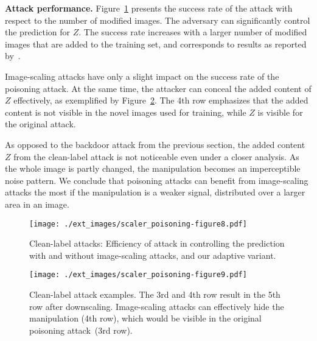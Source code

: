 \documentclass[conference]{IEEEtran}
\renewcommand{\paragraph}[1]{{\vskip 8pt \noindent\bf #1 }}
\newcommand{\ti}{\ensuremath{Z}\xspace}
\begin{document}
\paragraph{Attack performance.}
Figure~\ref{fig:eval_cleanlabel_scaling} presents the success rate of 
the attack with respect to the number of modified images. The adversary 
can significantly control the prediction for $\ti$. The success rate 
increases with a larger number of modified images that are added to the 
training set, and corresponds to results as reported 
by~\citet{ShaHuaNaj+18}. 


Image-scaling attacks have only a slight impact on 
the success rate of the poisoning attack. At the same time, the 
attacker can conceal the added content of $\ti$ effectively, as 
exemplified by Figure~\ref{fig:eval_cleanlabel_scaling_examples}. 
The 4th row emphasizes that the added content is not visible in the 
novel images used for training, while $\ti$ is visible for the original 
attack. 

As opposed to the backdoor attack from the previous {section\EndAccSupp{}}, the added
content \ti from the clean-label attack is not noticeable even under a
closer analysis.
As the whole image is partly changed, the manipulation becomes an 
imperceptible noise pattern. We conclude that poisoning attacks can 
benefit from image-scaling attacks the most if the manipulation is a 
weaker signal, {distributed\EndAccSupp{}} over a larger area in an image. 

\begin{figure}
	\centering
	\texttt{[image: ./ext\_images/scaler\_poisoning-figure8.pdf]}
	\vspace{-0.30cm}
	\caption{Clean-label attacks: Efficiency of attack in controlling 
	the prediction with and without image-scaling attacks, and our 
	adaptive variant.}
	\label{fig:eval_cleanlabel_scaling}
\end{figure}

\begin{figure}
	\centering
	\texttt{[image: ./ext\_images/scaler\_poisoning-figure9.pdf]}
	\caption{Clean-label attack examples. The 3rd and 4th row result in 
	the 5th row after downscaling. Image-scaling attacks can 
		effectively hide the manipulation (4th row), which would be 
		visible in the original poisoning attack~(3rd row).}
	\label{fig:eval_cleanlabel_scaling_examples}
\end{figure}
\end{document}
